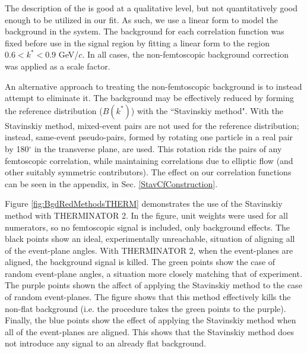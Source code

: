 \documentclass[/home/jesse/Analysis/FemtoAnalysis/AnalysisNotes/AnalysisNoteJBuxton.tex]{subfiles}
\begin{document}
The description of the \LamKs is good at a qualitative level, but not quantitatively good enough to be utilized in our fit.
As such, we use a linear form to model the background in the \LamKs system.
The background for each correlation function was fixed before use in the signal region by fitting a linear form to the region $0.6 < k^{*} < 0.9$ GeV/$c$.
In all cases, the non-femtoscopic background correction was applied as a scale factor.

An alternative approach to treating the non-femtoscopic background is to instead attempt to eliminate it.
The background may be effectively reduced by forming the reference distribution ($B(k^{*})$) with the ``Stavinskiy method".
With the Stavinskiy method, mixed-event pairs are not used for the reference distribution; instead, same-event pseudo-pairs, formed by rotating one particle in a real pair by 180$^\circ$ in the transverse plane, are used.  
This rotation rids the pairs of any femtoscopic correlation, while maintaining correlations due to elliptic flow (and other suitably symmetric contributors).
The effect on our \LamK correlation functions can be seen in the appendix, in Sec. \ref{StavCfConstruction}.

Figure \ref{fig:BgdRedMethodsTHERM} demonstrates the use of the Stavinskiy method with THERMINATOR 2.  
In the figure, unit weights were used for all numerators, so no femtoscopic signal is included, only background effects.  
The black points show an ideal, experimentally unreachable, situation of aligning all of the event-plane angles.  
With THERMINATOR 2, when the event-planes are aligned, the background signal is killed.  
The green points show the case of random event-plane angles, a situation more closely matching that of experiment.  
The purple points shown the affect of applying the Stavinskiy method to the case of random event-planes.  
The figure shows that this method effectively kills the non-flat background (i.e. the procedure takes the green points to the purple).  
Finally, the blue points show the effect of applying the Stavinskiy method when all of the event-planes are aligned.  
This shows that the Stavinskiy method does not introduce any signal to an already flat background.
\end{document}
